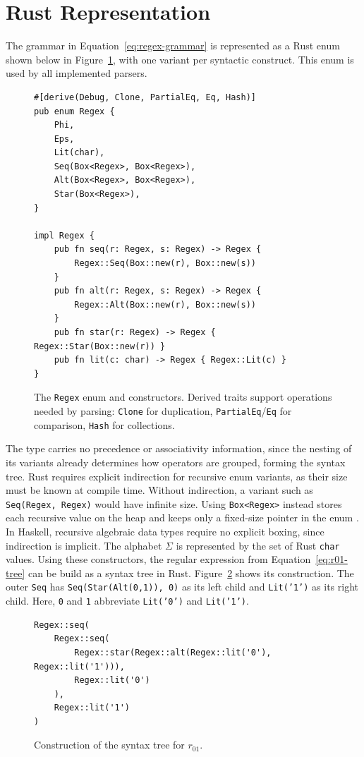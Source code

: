 %
%
%

\clearpage
\section{Rust Representation}
\label{sec:regex-rust-implementation}

The grammar in Equation~\eqref{eq:regex-grammar} 
is represented as a Rust enum shown below in Figure~\ref{fig:regex-enum}, 
with one variant per syntactic construct.
This enum is used by all implemented parsers.

\begin{figure}[ht]
\small
\begin{verbatim}
#[derive(Debug, Clone, PartialEq, Eq, Hash)]
pub enum Regex {
    Phi, 
    Eps, 
    Lit(char),            
    Seq(Box<Regex>, Box<Regex>),   
    Alt(Box<Regex>, Box<Regex>),   
    Star(Box<Regex>),               
}

impl Regex {
    pub fn seq(r: Regex, s: Regex) -> Regex {
        Regex::Seq(Box::new(r), Box::new(s))
    }
    pub fn alt(r: Regex, s: Regex) -> Regex {
        Regex::Alt(Box::new(r), Box::new(s))
    }
    pub fn star(r: Regex) -> Regex { Regex::Star(Box::new(r)) }
    pub fn lit(c: char) -> Regex { Regex::Lit(c) }
}
\end{verbatim}
\caption{The \texttt{Regex} enum and constructors. Derived traits support
operations needed by parsing: \texttt{Clone} for duplication,
\texttt{PartialEq}/\texttt{Eq} for comparison, \texttt{Hash} for collections.}
\label{fig:regex-enum}
\end{figure}

The type carries no precedence or associativity
information, since the nesting of its variants
already determines how operators are grouped,
forming the syntax tree.
Rust requires explicit indirection for recursive
enum variants, as their size must be known at
compile time.
Without indirection, a variant such as
\texttt{Seq(Regex, Regex)} would have infinite size.
Using \texttt{Box<Regex>} instead stores each
recursive value on the heap and keeps only
a fixed-size pointer in the enum
\citep{rust-book-box,rust-reference-recursive-types}.
In Haskell, recursive algebraic data types
require no explicit boxing, since indirection is implicit.
The alphabet $\Sigma$ is represented by
the set of Rust \texttt{char} values.
Using these constructors, the regular expression
from Equation~\eqref{eq:r01-tree} can be build
as a syntax tree in Rust.
Figure~\ref{fig:r01-rust} shows its construction.
The outer \texttt{Seq} has
\texttt{Seq(Star(Alt(0,1)), 0)} as its left child
and \texttt{Lit('1')} as its right child.
Here, \texttt{0} and \texttt{1} abbreviate
\texttt{Lit('0')} and \texttt{Lit('1')}.


\begin{figure}[ht]
\small
\begin{verbatim}
Regex::seq(
    Regex::seq(
        Regex::star(Regex::alt(Regex::lit('0'), Regex::lit('1'))),
        Regex::lit('0')
    ),
    Regex::lit('1')
)
\end{verbatim}
\caption{Construction of the syntax tree for $r_{01}$.}
\label{fig:r01-rust}
\end{figure}
